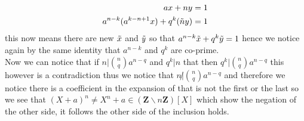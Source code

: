 \documentclass[../Main.tex]{subfiles}
\begin{document}
\begin{enumerate}
\begin{align}
    ax+ny=1\\
    a^{n-k}(a^{k-n+1}x)+q^k(\Tilde{n}y)=1
\end{align}
this now means there are new $\Tilde{x}$ and $\Tilde{y}$ so that $a^{n-k}\Tilde{x}+q^k\Tilde{y}=1$ hence we notice again by the same identity that $a^{n-k}$ and $q^k$ are co-prime.\\
Now we can notice that if $n|\binom{n}{q}a^{n-q}$ and $q^k|n$ that then $q^k|\binom{n}{q}a^{n-q}$ this however is a contradiction thus we notice that $n\not|\binom{n}{q}a^{n-q}$ and therefore we notice there is a coefficient in the expansion of that is not the first or the last so we see that $(X+a)^n\neq X^n+a\in (\mathbf{Z}\backslash n\mathbf{Z})[X]$ which show the negation of the other side, it follows the other side of the inclusion holds.\\
\end{enumerate}
\end{document}

